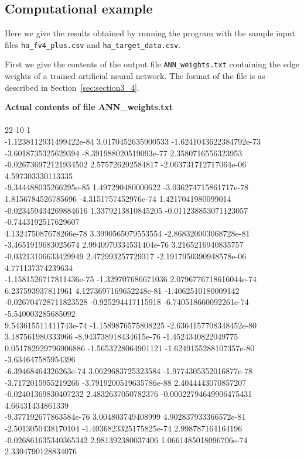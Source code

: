 \documentclass[11pt,titlepage,dvipdfmx,twoside]{article}
\begin{document}
\subsection{Computational example}
\label{sec:section5_2}

Here we give the results obtained by running the program with the sample
input files \verb|ha_fv4_plus.csv| and \verb|ha_target_data.csv|.

First we give the contents of the output file \verb|ANN_weights.txt|
containing the edge weights of a trained artificial neural network.
The format of the file is as described in Section~\ref{sec:section3_4}.

\bigskip


\begin{oframed}
{\bf Actual contents of file ANN\_weights.txt}\\\\
22 10 1\\
-1.1238112931499422e-84 3.0170452635900533 -1.6241043622384792e-73 -3.6018735325629394 -8.391988020519093e-77 2.3580716556323953 -0.026736972121934502 2.575726292584817 -2.063731712717064e-06 4.597303330113335 \\
-9.344488035266295e-85 1.497290480000622 -3.036274715861717e-78 1.8156784526785696 -4.3151757452976e-74 1.4217041980099014 -0.023459434269884616 1.3379213810845205 -0.011238853071123057 -0.7443192517629607 \\
4.132475087678266e-78 3.3990565079553554 -2.868320003068728e-81 -3.4651919683025674 2.9940970334531404e-76 3.2165216940835757 -0.03213106633429949 2.472993257729317 -2.1917950390948578e-06 4.771137374239634 \\
-1.1581526717811436e-75 -1.329707686671036 2.0796776718616044e-74 6.237593937811961 4.1273697169652248e-81 -1.4062510180009142 -0.026704728711823528 -0.925294417115918 -6.740518660092261e-74 -5.540003285685092 \\
9.543615511411743e-74 -1.1589876575808225 -2.6364157708348452e-80 3.187561980333966 -8.943738918434615e-76 -1.4524340822049775 0.051782929796906886 -1.5653228064901121 -1.6249155288107357e-80 -3.634647585954396 \\
-6.39468464326263e-74 3.0629683725323584 -1.9774305352016877e-78 -3.7172015955219266 -3.7919200519635786e-88 2.4044443070857207 -0.02401369830407232 2.4832637050782376 -0.00022794649906475431 4.66431434861339 \\
-9.377192677863584e-76 3.004803749408999 4.902837933366572e-81 -2.5013050438170104 -1.4036823325175825e-74 2.998787164164196 -0.026861635340365342 2.981392380037406 1.0661485018096706e-74 2.3304790128834076 \\

\end{oframed}
\end{document}
